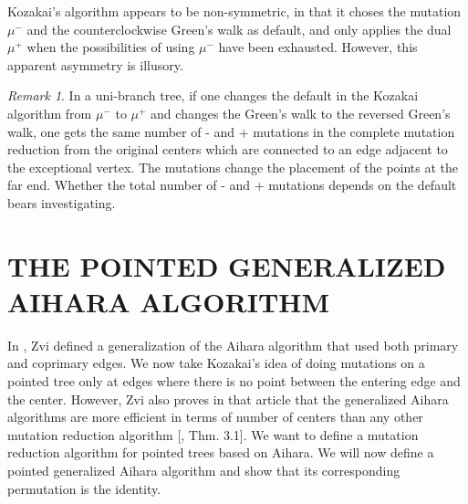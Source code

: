 \documentclass[11pt,english]{article}
\numberwithin{figure}{section}
\numberwithin{equation}{section}
\numberwithin{table}{section}
\theoremstyle{definition}
\theoremstyle{remark}
\newtheorem{remark}{Remark}[section]
\begin{document}
Kozakai's algorithm appears to be non-symmetric, in that it choses the mutation 
$\mu^-$ and the counterclockwise Green's walk as default, and only applies the 
dual $\mu^+$ when the possibilities of using $\mu^-$ have been exhausted.  However, this apparent asymmetry is illusory.  

\begin{remark}\label{duality}
	In a uni-branch tree, if one changes the default in the Kozakai algorithm from $\mu^-$ to $\mu^+$ and changes the Green's walk to the reversed Green's walk,  one gets the same number of - and + mutations in the complete mutation reduction from the original centers which are connected to an edge adjacent to the exceptional vertex. The mutations change the placement of the points at the far end. Whether the total number of - and + mutations depends on the default bears investigating. 
\end{remark}


	

\section{THE POINTED GENERALIZED AIHARA ALGORITHM}

In \cite{Z2}, Zvi defined a generalization of the Aihara algorithm that used both primary and coprimary edges.  We now take Kozakai's idea of doing mutations on a pointed tree only at edges where there is no point between the entering edge and the center.  However,  Zvi also proves in that article that the generalized Aihara algorithms are more efficient in terms of number of centers than any other mutation reduction algorithm [\cite{Z2}, Thm. 3.1]. We want to define a mutation reduction algorithm for pointed trees based on Aihara. We will now define a pointed generalized Aihara algorithm and show that its corresponding permutation is the identity.
\end{document}
